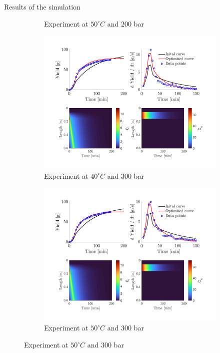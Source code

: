 \documentclass[8pt]{beamer}
\begin{document}
\begin{frame}[fragile]{Results of the simulation}
\begin{figure}[!h]
\begin{subfigure}[b]{0.49\textwidth}
				\caption{Experiment at $50^\circ C$ and $200$ bar}
			\end{subfigure}
			\begin{subfigure}[b]{0.49\textwidth}
				\centering
				\includegraphics[trim = 2cm 10.5cm 2.5cm 2.02cm,clip,width=\textwidth]{Figures/Fitting_LUKE_T40_P300_org.pdf}
				\caption{Experiment at $40^\circ C$ and $300$ bar}
			\end{subfigure}
			\hfill
			\begin{subfigure}[b]{0.49\textwidth}
				\centering
				\includegraphics[trim = 2cm 10.5cm 2.5cm 2.02cm,clip,width=\textwidth]{Figures/Fitting_LUKE_T50_P300_org.pdf}
				\caption{Experiment at $50^\circ C$ and $300$ bar}

\end{subfigure}
\end{figure}
\end{frame}
\end{document}
